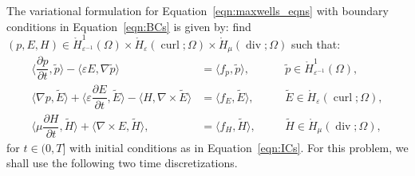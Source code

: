\documentclass{amsart}
\theoremstyle{thmstyleone}%
\theoremstyle{thmstyletwo}%
\theoremstyle{thmstylethree}%
\DeclareMathOperator{\curl}{curl}
\def\divgn{\operatorname{div}}
\newcommand{\aInnerproduct}[2]{\bigl\langle #1, #2 \bigr\rangle}
\begin{document}
The variational formulation for Equation~\eqref{eqn:maxwells_eqns} with boundary conditions in Equation~\eqref{eqn:BCs} is given by: find $(p, E, H) \in \mathring{H}^1_{\varepsilon^{-1}}(\Omega) \times \mathring{H}_{\varepsilon}(\curl; \Omega) \times \mathring{H}_{\mu}(\divgn; \Omega)$ such that:
\begin{subequations}
  \begin{alignat}{2}
    \aInnerproduct{\dfrac{\partial p}{\partial t}}{\widetilde{p}} - \aInnerproduct{ \varepsilon E}{\nabla \widetilde{p}} &= \aInnerproduct{f_p}{\widetilde{p}}, &&\quad \widetilde{p} \in \mathring{H}^1_{\varepsilon^{-1}}(\Omega), \label{eqn:maxwell_p_wf} \\
    \aInnerproduct{\nabla p}{\widetilde{E}} + \aInnerproduct{\varepsilon \dfrac{\partial E}{\partial t}}{\widetilde{E}} - \aInnerproduct{H}{\nabla \times \widetilde{E}} &= \aInnerproduct{f_E}{\widetilde{E}}, &&\quad \widetilde{E} \in \mathring{H}_{\varepsilon}(\curl; \Omega), \label{eqn:maxwell_E_wf} \\
    \aInnerproduct{\mu \dfrac{\partial H}{\partial t}}{\widetilde{H}} + \aInnerproduct{\nabla \times E}{\widetilde{H}}, &= \aInnerproduct{f_H}{\widetilde{H}}, &&\quad \widetilde{H} \in \mathring{H}_{\mu}(\divgn; \Omega), \label{eqn:maxwell_H_wf}
  \end{alignat}
\end{subequations}
for $t \in (0, T]$ with initial conditions as in Equation~\eqref{eqn:ICs}. For this problem, we shall use the following two time discretizations.
\end{document}
